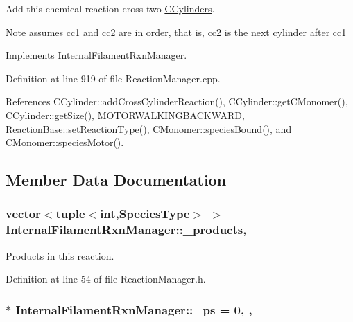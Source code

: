 Add this chemical reaction cross two \hyperlink{classCCylinder}{C\+Cylinders}. 

\begin{DoxyNote}{Note}
assumes cc1 and cc2 are in order, that is, cc2 is the next cylinder after cc1 
\end{DoxyNote}


Implements \hyperlink{classInternalFilamentRxnManager_ac8152bcd9f6aa5d69f85a98cff86d2b0}{Internal\+Filament\+Rxn\+Manager}.



Definition at line 919 of file Reaction\+Manager.\+cpp.



References C\+Cylinder\+::add\+Cross\+Cylinder\+Reaction(), C\+Cylinder\+::get\+C\+Monomer(), C\+Cylinder\+::get\+Size(), M\+O\+T\+O\+R\+W\+A\+L\+K\+I\+N\+G\+B\+A\+C\+K\+W\+A\+R\+D, Reaction\+Base\+::set\+Reaction\+Type(), C\+Monomer\+::species\+Bound(), and C\+Monomer\+::species\+Motor().



\subsection{Member Data Documentation}
\hypertarget{classInternalFilamentRxnManager_afd213da1a3706e2e88962e5da886a5dc}{
\subsubsection[{\+\_\+products}]{\setlength{\rightskip}{0pt plus 5cm}vector$<$tuple$<$int,{\bf Species\+Type}$>$ $>$ Internal\+Filament\+Rxn\+Manager\+::\+\_\+products\hspace{0.3cm}{\ttfamily [protected]}, {\ttfamily [inherited]}}}\label{classInternalFilamentRxnManager_afd213da1a3706e2e88962e5da886a5dc}


Products in this reaction. 



Definition at line 54 of file Reaction\+Manager.\+h.

\hypertarget{classInternalFilamentRxnManager_a973ce9cc2aae811e6867afa46193c5f2}{
\subsubsection[{\+\_\+ps}]{ $\ast$ Internal\+Filament\+Rxn\+Manager\+::\+\_\+ps = 0\hspace{0.3cm}{\ttfamily [static]}, {\ttfamily [protected]}, {\ttfamily [inherited]}}}\label{classInternalFilamentRxnManager_a973ce9cc2aae811e6867afa46193c5f2}


